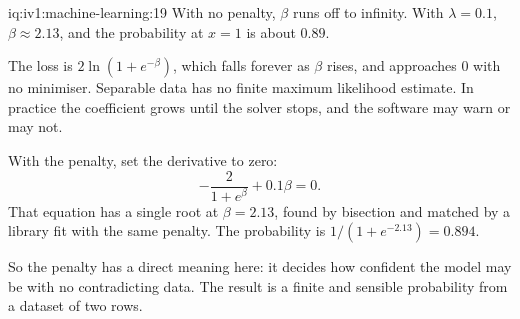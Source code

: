 \begin{solution}{iq:iv1:machine-learning:19}
With no penalty, $\beta$ runs off to infinity. With $\lambda = 0.1$, $\beta \approx 2.13$, and the probability at $x = 1$ is about $0.89$.

The loss is $2\ln(1 + e^{-\beta})$, which falls forever as $\beta$ rises, and approaches 0 with no minimiser. Separable data has no finite maximum likelihood estimate. In practice the coefficient grows until the solver stops, and the software may warn or may not.

With the penalty, set the derivative to zero:
\[
-\frac{2}{1 + e^{\beta}} + 0.1\beta = 0.
\]
That equation has a single root at $\beta = 2.13$, found by bisection and matched by a library fit with the same penalty. The probability is $1/(1 + e^{-2.13}) = 0.894$.

So the penalty has a direct meaning here: it decides how confident the model may be with no contradicting data. The result is a finite and sensible probability from a dataset of two rows.



\end{solution}

